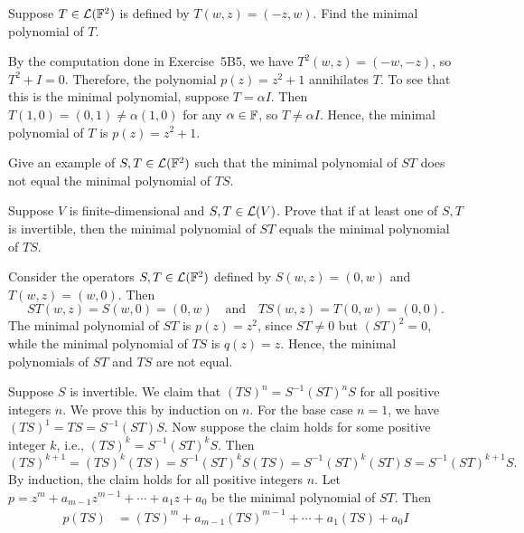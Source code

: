\begin{exc}
\begin{exercise}
Suppose $T\in\mathcal{L}(\mathbb{F}^2)$ is defined by $T(w,z)=(-z,w)$. Find the minimal
polynomial of $T$.
\end{exercise}
\begin{solution}
By the computation done in Exercise~5B5, we have $T^2(w,z)=(-w,-z)$, so
$T^2+I=0$. Therefore, the polynomial $p(z)=z^2+1$ annihilates $T$. To see that
this is the minimal polynomial, suppose $T=\alpha I$. Then
$T(1,0)=(0,1)\ne\alpha(1,0)$ for any $\alpha\in\mathbb{F}$, so $T\ne\alpha I$. Hence,
the minimal polynomial of $T$ is $p(z)=z^2+1$.
\end{solution}

\begin{exercise}\leavevmode
\begin{parts}
\item Give an example of $S,T\in\mathcal{L}(\mathbb{F}^2)$ such that the minimal polynomial
  of $ST$ does not equal the minimal polynomial of $TS$.
\item Suppose $V$ is finite-dimensional and $S,T\in\mathcal{L}(V)$. Prove that if at
  least one of $S,T$ is invertible, then the minimal polynomial of $ST$ equals
  the minimal polynomial of $TS$.
\end{parts}
\end{exercise}
\begin{solution}\leavevmode
\begin{parts}
\item Consider the operators $S,T\in\mathcal{L}(\mathbb{F}^2)$ defined by $S(w,z)=(0,w)$ and
  $T(w,z)=(w,0)$. Then
  \[ ST(w,z)=S(w,0)=(0,w) \quad\text{and}\quad TS(w,z)=T(0,w)=(0,0). \]
  The minimal polynomial of $ST$ is $p(z)=z^2$, since $ST\ne0$ but
  $(ST)^2=0$, while the minimal polynomial of $TS$ is $q(z)=z$. Hence, the
  minimal polynomials of $ST$ and $TS$ are not equal.
\item Suppose $S$ is invertible. We claim that $(TS)^n=S^{-1}(ST)^nS$ for all
  positive integers $n$. We prove this by induction on $n$. For the base case
  $n=1$, we have $(TS)^1=TS=S^{-1}(ST)S$. Now suppose the claim holds for some
  positive integer $k$, i.e., $(TS)^k=S^{-1}(ST)^kS$. Then
  \[ (TS)^{k+1}=(TS)^k(TS)=S^{-1}(ST)^kS(TS)=S^{-1}(ST)^k(ST)S
     =S^{-1}(ST)^{k+1}S. \]
  By induction, the claim holds for all positive integers $n$. Let
  $p=z^m+a_{m-1}z^{m-1}+\cdots+a_1z+a_0$ be the minimal polynomial of $ST$.
  Then
  \begin{align*}
  p(TS) &= (TS)^m+a_{m-1}(TS)^{m-1}+\cdots+a_1(TS)+a_0I\\

\end{align*}
\end{parts}
\end{solution}
\end{exc}
